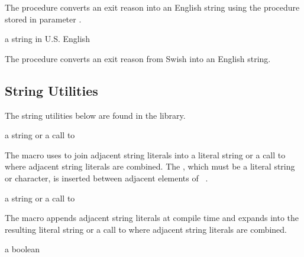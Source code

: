 The  procedure converts an exit reason into
an English string using the procedure stored in parameter
.

\begin{procedure}
\end{procedure}
\returns{} a string in U.S. English

The  procedure converts an exit
reason from Swish into an English string.

\subsection{String Utilities}

The string utilities below are found in the  library.

\begin{syntax}
\end{syntax}
\expandsto{} a string or a call to 

The  macro uses  to join adjacent string
literals into a literal string or a call to  where adjacent
string literals are combined.
The , which must be a literal string or character, is inserted
between adjacent elements of ~\etc{}.

\begin{syntax}
\end{syntax}
\expandsto{} a string or a call to 

The  macro appends adjacent string literals
at compile time and expands into the resulting literal string or a
call to  where adjacent string literals are
combined.

\begin{procedure}
\end{procedure}
\returns{} a boolean

